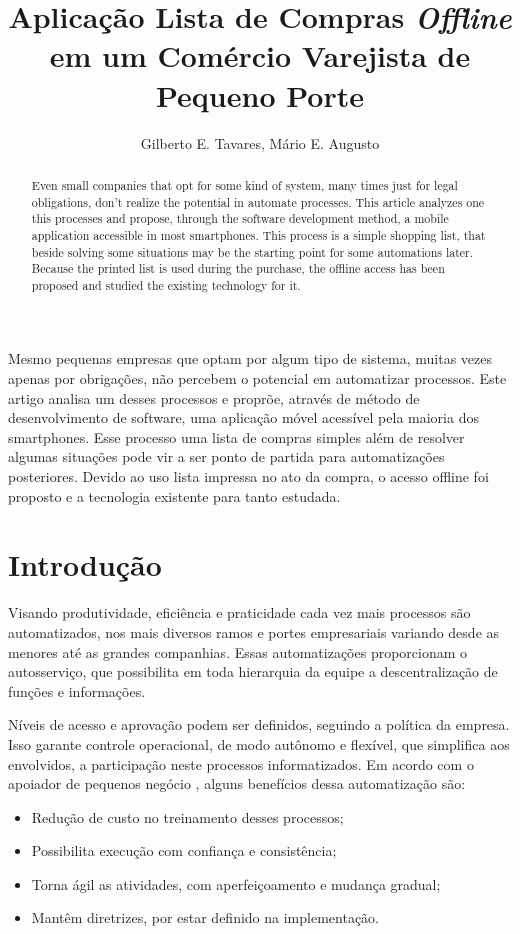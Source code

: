 \documentclass[12pt]{article}
\title{Aplicação Lista de Compras \textit{Offline}\\em um Comércio Varejista de Pequeno Porte}
\author{Gilberto E. Tavares\inst{1}, Mário E. Augusto\inst{1}}
\begin{document}
\maketitle

\begin{abstract}
Even small companies that opt for some kind of system, many times just for legal obligations, don't realize the potential in automate processes. This article analyzes one this processes and propose, through the software development method, a mobile application accessible in most smartphones. This process is a simple shopping list, that beside solving some situations may be the starting point for some automations later. Because the printed list is used during the purchase, the offline access has been proposed and studied the existing technology for it.
\end{abstract}

\begin{resumo}
Mesmo pequenas empresas que optam por algum tipo de sistema, muitas vezes apenas por obrigações, não percebem o potencial em automatizar processos. Este artigo analisa um desses processos e proprõe, através de método de desenvolvimento de software, uma aplicação móvel acessível pela maioria dos smartphones. Esse processo uma lista de compras simples além de resolver algumas situações pode vir a ser ponto de partida para automatizações posteriores. Devido ao uso lista impressa no ato da compra, o acesso offline foi proposto e a tecnologia existente para tanto estudada.
\end{resumo}


\section{Introdução}

Visando produtividade, eficiência e praticidade cada vez mais processos são automatizados, nos mais diversos ramos e portes empresariais variando desde as menores até as grandes companhias. Essas automatizações proporcionam o autosserviço, que possibilita em toda hierarquia da equipe a descentralização de funções e informações.

Níveis de acesso e aprovação podem ser definidos, seguindo a política da empresa. Isso garante controle operacional, de modo autônomo e flexível, que simplifica aos envolvidos, a participação neste processos informatizados. Em acordo com o apoiador de pequenos negócio \cite{sebrae2015}, alguns benefícios dessa automatização são:
\begin{itemize}
\item Redução de custo no treinamento desses processos;
\item Possibilita execução com confiança e consistência;
\item Torna ágil as atividades, com aperfeiçoamento e mudança gradual;
\item Mantêm diretrizes, por estar definido na implementação.
\end{itemize}
\end{document}
